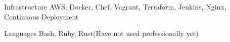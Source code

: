 

\begin{cvskills}

  \cvskill
    {Infrastructure} %
    {AWS, Docker, Chef, Vagrant, Terraform, Jenkins, Nginx, Continuous Deployment} %

  \cvskill
    {Languages} %
    {Bash, Ruby, Rust(Have not used professionally yet)} %

\end{cvskills}
